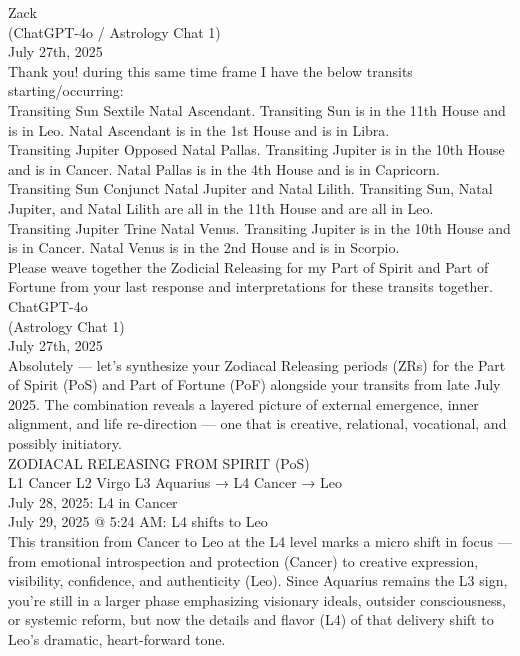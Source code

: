 \documentclass{article}
\begin{document}
Zack\\
(ChatGPT-4o / Astrology Chat 1)\\
July 27th, 2025\\
Thank you! during this same time frame I have the below transits starting/occurring:\\
Transiting Sun Sextile Natal Ascendant. Transiting Sun is in the 11th House and is in Leo. Natal Ascendant is in the 1st House and is in Libra.\\
Transiting Jupiter Opposed Natal Pallas. Transiting Jupiter is in the 10th House and is in Cancer. Natal Pallas is in the 4th House and is in Capricorn.\\
Transiting Sun Conjunct Natal Jupiter and Natal Lilith. Transiting Sun, Natal Jupiter, and Natal Lilith are all in the 11th House and are all in Leo.\\
Transiting Jupiter Trine Natal Venus. Transiting Jupiter is in the 10th House and is in Cancer. Natal Venus is in the 2nd House and is in Scorpio.\\
Please weave together the Zodicial Releasing for my Part of Spirit and Part of Fortune from your last response and interpretations for these transits together.\\
ChatGPT-4o\\
(Astrology Chat 1)\\
July 27th, 2025\\
Absolutely --- let's synthesize your Zodiacal Releasing periods (ZRs) for the Part of Spirit (PoS) and Part of Fortune (PoF) alongside your transits from late July 2025. The combination reveals a layered picture of external emergence, inner alignment, and life re-direction --- one that is creative, relational, vocational, and possibly initiatory.\\
ZODIACAL RELEASING FROM SPIRIT (PoS)\\
L1 Cancer L2 Virgo L3 Aquarius → L4 Cancer → Leo\\
July 28, 2025: L4 in Cancer\\
July 29, 2025 @ 5:24 AM: L4 shifts to Leo\\
This transition from Cancer to Leo at the L4 level marks a micro shift in focus --- from emotional introspection and protection (Cancer) to creative expression, visibility, confidence, and authenticity (Leo). Since Aquarius remains the L3 sign, you're still in a larger phase emphasizing visionary ideals, outsider consciousness, or systemic reform, but now the details and flavor (L4) of that delivery shift to Leo's dramatic, heart-forward tone.\\
\end{document}
